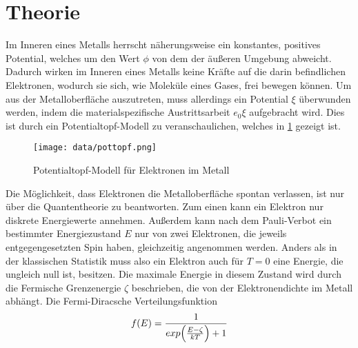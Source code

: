 \section{Theorie}
\label{sec:Theorie}
Im Inneren eines Metalls herrscht näherungsweise ein konstantes, positives Potential, welches um den Wert $\phi$
von dem der äußeren Umgebung abweicht. Dadurch wirken im Inneren eines Metalls keine Kräfte auf die darin 
befindlichen Elektronen, wodurch sie sich, wie Moleküle eines Gases, frei bewegen können. Um aus der Metalloberfläche
auszutreten, muss allerdings ein Potential $\xi $ überwunden werden, indem die materialspezifische Austrittsarbeit
$ e_0\xi$ aufgebracht wird. Dies ist durch ein Potentialtopf-Modell zu veranschaulichen, welches in  \ref{fig:pottopf}
gezeigt ist. 
 \begin{figure}
     \centering
     \texttt{[image: data/pottopf.png]}
     \caption{Potentialtopf-Modell für Elektronen im Metall}
     \label{fig:pottopf}
 \end{figure}
\FloatBarrier
Die Möglichkeit, dass Elektronen die Metalloberfläche spontan verlassen, ist nur über die Quantentheorie zu beantworten.
Zum einen kann ein Elektron nur diskrete Energiewerte annehmen. Außerdem kann nach dem Pauli-Verbot ein bestimmter Energiezustand $E$ nur von zwei 
Elektronen, die jeweils entgegengesetzten Spin haben, gleichzeitig angenommen werden. Anders als in der klassischen Statistik muss also ein Elektron
auch für $T=0$ eine Energie, die ungleich null ist, besitzen. Die maximale Energie in diesem Zustand wird durch die Fermische Grenzenergie $\zeta$
beschrieben, die von der Elektronendichte im Metall abhängt. 
Die Fermi-Diracsche Verteilungsfunktion
\begin{equation}
    f(E) = \frac{1}{exp \Bigl(\frac{E-\zeta}{kT}\Bigr) +1}
\end{equation}

